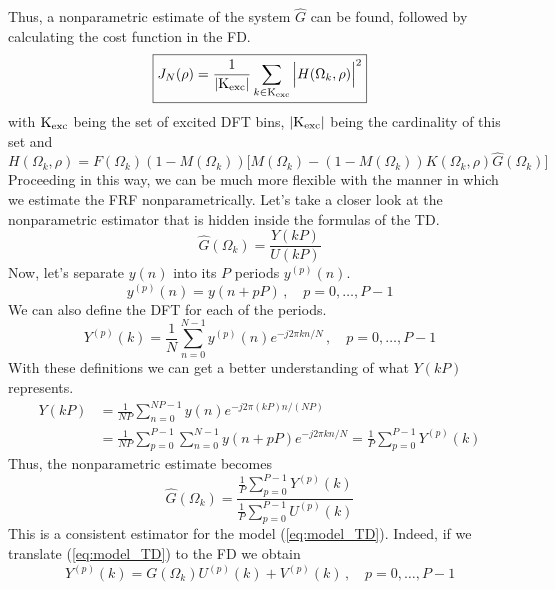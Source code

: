\newpage
Thus, a nonparametric estimate of the system $\hat{G}$ can be found, followed by calculating the cost function in the FD.
\begin{equation}
\boxed{
    J_N(\rho) = \frac{1}{|\text{K}_{\text{exc}}|}\sum_{k \in \text{K}_{\text{exc}}} \Big|H(\Omega_k,\rho)\Big|^2
\label{eq:JFD}
}
\end{equation} 
with $\text{K}_{\text{exc}}$ being the set of excited DFT bins, $|\text{K}_{\text{exc}}|$ being the cardinality of this set and
\begin{equation}
    H(\Omega_k,\rho) = F(\Omega_k)(1-M(\Omega_k)) \Big[M(\Omega_k)-(1-M(\Omega_k))K(\Omega_k,\rho) \hat{G}(\Omega_k)\Big]
\end{equation}
Proceeding in this way, we can be much more flexible with the manner in which we estimate the FRF nonparametrically. Let's take a closer look at the nonparametric estimator that is hidden inside the formulas of the TD.
\begin{equation*}
    \hat G(\Omega_k) = \frac{Y(kP)}{U(kP)}
\end{equation*}
Now, let's separate $y(n)$ into its $P$ periods $y^{(p)}(n)$.
\begin{equation*}
    y^{(p)}(n) = y(n+pP) \,,\quad p = 0,\ldots,P-1
\end{equation*}
We can also define the DFT for each of the periods.
\begin{equation*}
    Y^{(p)}(k) = \frac{1}{N}\sum_{n=0}^{N-1} y^{(p)}(n) e^{-j2\pi kn/N} \,,\quad p = 0,\ldots,P-1
\end{equation*}
With these definitions we can get a better understanding of what $Y(kP)$ represents.
\begin{align*}
    Y(kP) &= \frac{1}{N P}\sum_{n=0}^{N\!P-1} y(n) e^{-j2\pi (kP) n/(N\!P)}\\
    &= \frac{1}{N P} \sum_{p=0}^{P-1}  \sum_{n=0}^{N-1} y(n+pP) e^{-j2\pi kn/N} = \frac{1}{P} \sum_{p=0}^{P-1} Y^{(p)}(k)
\end{align*}
Thus, the nonparametric estimate becomes
\begin{equation}
    \hat G(\Omega_k) = \frac{\frac{1}{P}\sum_{p=0}^{P-1}  Y^{(p)}(k)}{\frac{1}{P}\sum_{p=0}^{P-1}  U^{(p)}(k)}
    \label{eq:nonparametric_simple}
\end{equation}
This is a consistent estimator for the model (\ref{eq:model_TD}). Indeed, if we translate (\ref{eq:model_TD}) to the FD we obtain
\begin{equation*}
    Y^{(p)}(k) = G(\Omega_k) U^{(p)}(k) + V^{(p)}(k) \,,\quad p = 0,\ldots,P-1
\end{equation*}
